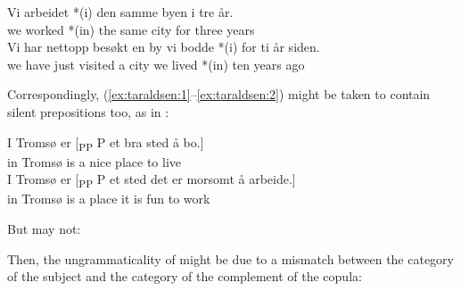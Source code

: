 \documentclass[output=paper]{LSP/langsci}
\begin{document}
\begin{exe}%
    \ea \gll Vi arbeidet *(i) den samme byen  i tre år.\\
         we worked *(in) the same city     for three years\\
    \ex \gll Vi har nettopp besøkt en by vi bodde *(i) for ti år siden.\\
	 we have just    visited a  city we lived *(in) {} ten years ago\\
\z
\end{exe}

Correspondingly, (\ref{ex:taraldsen:1}--\ref{ex:taraldsen:2}) might be taken to contain silent prepositions too, as in :

\ea%
    \label{ex:taraldsen:21}
   \ea \gll I Tromsø er {[\textsubscript{PP} P} et bra sted å bo.]\\
	    in Tromsø is {}  a nice place to live\\
   \ex \gll I Tromsø er {[\textsubscript{PP} P} et sted det er morsomt å arbeide.]\\
	    in Tromsø is {}  a place it is fun          to work\\
\z\z

But  may not:

\begin{exe}
    \z
\end{exe}


\ea%
    \label{ex:taraldsen:23}
    \z
\z

Then, the ungrammaticality of  might be due to a mismatch between the category of the subject and the category of the complement of the copula:
\end{document}
